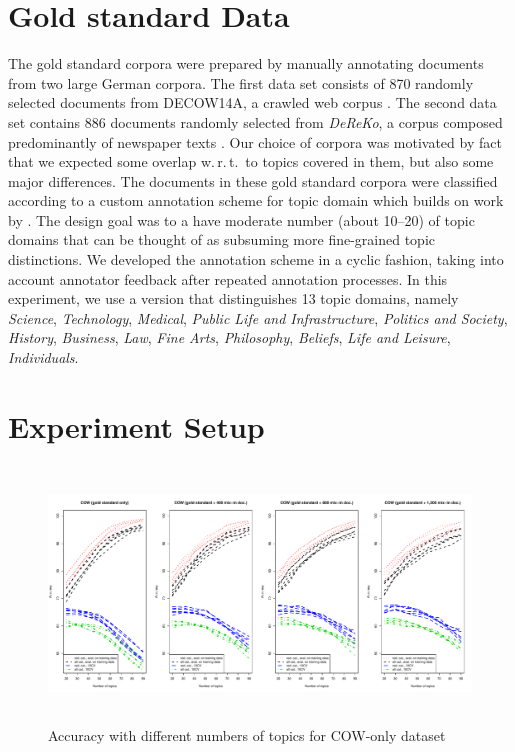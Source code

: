 \documentclass[11pt]{article}
\begin{document}
\section{Gold standard Data}
\label{sec:goldstandard}

The gold standard corpora were prepared by manually annotating documents from two large German corpora.
The first data set consists of 870 randomly selected documents from DECOW14A, a crawled web corpus \cite{SchaeferBildhauer2012a,Schaefer2015b}.
The second data set contains 886 documents randomly selected from \textit{DeReKo}, a corpus composed predominantly of newspaper texts \cite{KupietzEa2010}. 
Our choice of corpora was motivated by fact that we expected some overlap w.\,r.\,t.\ to topics covered in them, but also some major differences. 
The documents in these gold standard corpora were classified according to a custom annotation scheme for topic domain which builds on work by \cite{Sharoff2006}.
The design goal was to a have moderate number (about 10--20) of topic domains that can be thought of as subsuming more fine-grained topic distinctions.
We developed the annotation scheme in a cyclic fashion, taking into account annotator feedback after repeated annotation processes.
In this experiment, we use a version that distinguishes 13 topic domains, namely \textit{Science}, \textit{Technology}, \textit{Medical}, \textit{Public Life and Infrastructure}, \textit{Politics and Society}, \textit{History}, \textit{Business}, \textit{Law}, \textit{Fine Arts},  \textit{Philosophy}, \textit{Beliefs},  \textit{Life and Leisure}, \textit{Individuals}.

\section{Experiment Setup}
\label{sec:experiment}

\begin{figure}[h]
  \centering
  \includegraphics[width=\textwidth, height=6.8cm]{graphics/cow.pdf}
  \caption{Accuracy with different numbers of topics for COW-only dataset}
  \label{fig:cow}
\end{figure}
\end{document}

